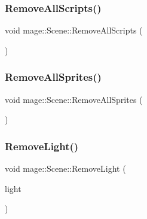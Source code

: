 \hypertarget{classmage_1_1_scene_a04b6e0b4d9ca18d15d3da098e581d336}{}\label{classmage_1_1_scene_a04b6e0b4d9ca18d15d3da098e581d336} 
\subsubsection{\texorpdfstring{Remove\+All\+Scripts()}{RemoveAllScripts()}}
{\footnotesize\ttfamily void mage\+::\+Scene\+::\+Remove\+All\+Scripts (\begin{DoxyParamCaption}{ }\end{DoxyParamCaption})}

\hypertarget{classmage_1_1_scene_aad8b532e9c127fd216ca9db9ad9f3420}{}\label{classmage_1_1_scene_aad8b532e9c127fd216ca9db9ad9f3420} 
\subsubsection{\texorpdfstring{Remove\+All\+Sprites()}{RemoveAllSprites()}}
{\footnotesize\ttfamily void mage\+::\+Scene\+::\+Remove\+All\+Sprites (\begin{DoxyParamCaption}{ }\end{DoxyParamCaption})}

\hypertarget{classmage_1_1_scene_a1da46b19f87d387af18d2f7fc37bb6d7}{}\label{classmage_1_1_scene_a1da46b19f87d387af18d2f7fc37bb6d7} 
\subsubsection{\texorpdfstring{Remove\+Light()}{RemoveLight()}\hspace{0.1cm}{\footnotesize\ttfamily [1/2]}}
{\footnotesize\ttfamily void mage\+::\+Scene\+::\+Remove\+Light (\begin{DoxyParamCaption}\item[{\hyperlink{namespacemage_a1e01ae66713838a7a67d30e44c67703e}{Shared\+Ptr}$<$ \hyperlink{namespacemage_a1724c6e6b6b5ba535cdd967cbbb4a669}{Omni\+Light\+Node} $>$}]{light }\end{DoxyParamCaption})\hspace{0.3cm}{\ttfamily [private]}}


